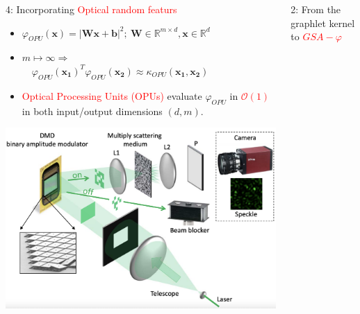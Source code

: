 \documentclass[final,dvipsnames]{beamer}
\newcommand{\vsp}{\vspace{10pt}}
\newcommand{\myemph}[1]{\textcolor{red}{#1}}
\newcommand{\mycolback}[1]{
\hspace*{.01\linewidth}\begin{minipage}{.96\linewidth}
\begin{mdframed}[backgroundcolor=blue!10,linewidth=0pt]
\vsp
#1
\vsp
\end{mdframed}
\end{minipage}
}
\begin{document}
\begin{frame}{}
\begin{columns}[t]
\begin{column}{0.25\linewidth}
\begin{myalertblock}{4: Incorporating \myemph{Optical random featurs}}
	\vspace{0.3cm}
	\mycolback{
		\begin{itemize}
			\item  ${\varphi}_{OPU}(\mathbf{x})=|\mathbf{Wx+b}|^2 ;~\mathbf{W}\in \mathbb{R}^{m\times d}, \mathbf{x}\in \mathbb{R}^d$
			\vsp
			\item  $m\mapsto\infty \Rightarrow$\\ 
			$\quad {\varphi}_{OPU}(\mathbf{x_1})^T{\varphi}_{OPU}(\mathbf{x_2})\approx \kappa_{OPU}(\mathbf{x_1}, \mathbf{x_2})$
			\vsp
			\item \myemph{Optical Processing Units (OPUs)} evaluate $\varphi_{OPU}$ in \myemph{$\mathcal{O} (1)$} in both input/output dimensions $(d,m)$.
		\end{itemize}
		
	}
  \begin{center}
  \includegraphics[width=0.7\linewidth]{figs/opu}
\end{center}
\end{myalertblock}

\end{column}%




\begin{column}{0.45\linewidth}

\begin{block}{2: From the graphlet kernel to \myemph{$GSA-\varphi$}}
	\hspace*{.0\linewidth}\begin{minipage}{.99\linewidth}
		

\end{minipage}
\end{block}
\end{column}
\end{columns}
\end{frame}
\end{document}
